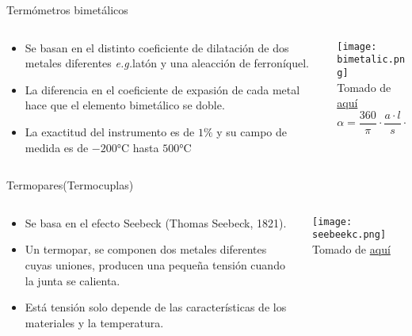 \documentclass[aspectratio=169]{beamer}
\begin{document}
\begin{frame}{Termómetros bimetálicos}
    \begin{columns}[c, onlytextwidth]
        \begin{column}{0.5\textwidth}
            \begin{itemize}
                \item Se basan en el distinto coeficiente de dilatación de dos metales diferentes \textit{e.g.}latón y una aleacción de ferroníquel. 
                \item La diferencia en el coeficiente de expasión de cada metal hace que el elemento bimetálico se doble. 
                \item La exactitud del instrumento es de $1\%$ y su campo de medida es de $-200\si{\celsius}$ hasta $500\si{\celsius}$
            \end{itemize}
        \end{column}
        \begin{column}{0.45\textwidth}
            \centering
            \texttt{[image: bimetalic.png]}
             \\ \tiny{Tomado de \href{https://natstuk.com/?p=786}{aquí}}
        \begin{equation*}
                \alpha = \dfrac{360}{\pi}\cdot \dfrac{a \cdot l}{s}\cdot (t_2-t_1) 
        \end{equation*}
        \end{column}
    \end{columns}
\end{frame}
\begin{frame}{Termopares(Termocuplas)}
    \begin{columns}[c, onlytextwidth]
        \begin{column}{0.55\textwidth}
            \begin{itemize}
                \item Se basa en el efecto Seebeck (Thomas Seebeck, 1821). 
                \item Un termopar, se componen dos metales diferentes cuyas uniones, producen una pequeña tensión cuando la junta se calienta. 
                \item Está tensión solo depende de las características de los materiales y la temperatura. 
            \end{itemize}
        \end{column}
        \begin{column}{0.40\textwidth}
        \texttt{[image: seebeekc.png]}
            \tiny{Tomado de \href{https://www.iue.tuwien.ac.at/phd/mwagner/node14.html}{aquí}}
        \end{column}
    \end{columns}
\end{frame}
\end{document}
